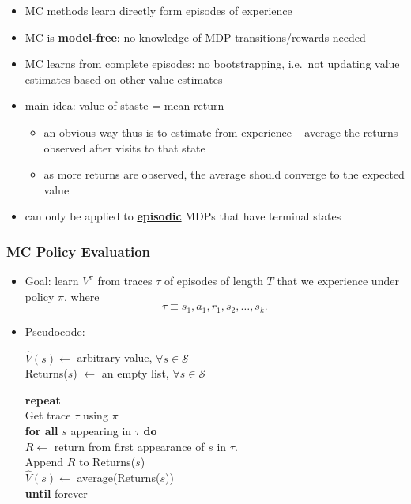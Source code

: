 \documentclass[twocolumn,landscape,10pt]{article}
\theoremstyle{definition}
\begin{document}
\begin{itemize}
    \item MC methods learn directly form episodes of experience
    \item MC is \textbf{\underline{model-free}}: no knowledge of MDP 
        transitions/rewards needed
    \item MC learns from complete episodes: no bootstrapping, i.e.\ not updating
        value estimates based on other value estimates
    \item main idea: value of staste = mean return
        \begin{itemize}
            \item an obvious way thus is to estimate from experience -- average
                the returns observed after visits to that state
            \item as more returns are observed, the average should converge to
                the expected value
        \end{itemize}
    \item can only be applied to \textbf{\underline{episodic}} MDPs that have
        terminal states
\end{itemize}

\subsubsection{MC Policy Evaluation}

\begin{itemize}
    \item Goal: learn $V^\pi$ from traces $\tau$ of episodes of length $T$ that
        we experience under policy $\pi$, where
        \[
            \tau\equiv s_1,a_1,r_1, s_2,\ldots,s_k.
        \]
    \item Pseudocode:

        $\hat{V}(s)\leftarrow$ arbitrary value, $\forall s\in\mathcal{S}$\\
        Returns($s$) $\leftarrow$ an empty list, $\forall s\in\mathcal{S}$

        \textbf{repeat}\\
        \hspace*{2ex}Get trace $\tau$ using $\pi$\\
        \hspace*{2ex}\textbf{for all} $s$ appearing in $\tau$ \textbf{do}\\
        \hspace*{4ex}$R\leftarrow$ return from first appearance of $s$ in
        $\tau$.\\
        \hspace*{4ex}Append $R$ to Returns($s$)\\
        \hspace*{4ex}$\hat{V}(s)\leftarrow$ average(Returns($s$))\\
        \textbf{until} forever
\end{itemize}
\end{document}
